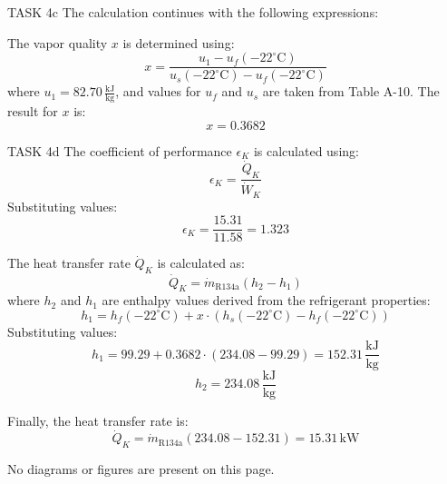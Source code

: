 TASK 4c  
The calculation continues with the following expressions:  

The vapor quality \( x \) is determined using:  
\[
x = \frac{u_1 - u_f(-22^\circ \text{C})}{u_s(-22^\circ \text{C}) - u_f(-22^\circ \text{C})}
\]  
where \( u_1 = 82.70 \, \frac{\text{kJ}}{\text{kg}} \), and values for \( u_f \) and \( u_s \) are taken from Table A-10. The result for \( x \) is:  
\[
x = 0.3682
\]  

TASK 4d  
The coefficient of performance \( \epsilon_K \) is calculated using:  
\[
\epsilon_K = \frac{\dot{Q}_K}{\dot{W}_K}
\]  
Substituting values:  
\[
\epsilon_K = \frac{15.31}{11.58} = 1.323
\]  

The heat transfer rate \( \dot{Q}_K \) is calculated as:  
\[
\dot{Q}_K = \dot{m}_{\text{R134a}} (h_2 - h_1)
\]  
where \( h_2 \) and \( h_1 \) are enthalpy values derived from the refrigerant properties:  
\[
h_1 = h_f(-22^\circ \text{C}) + x \cdot (h_s(-22^\circ \text{C}) - h_f(-22^\circ \text{C}))
\]  
Substituting values:  
\[
h_1 = 99.29 + 0.3682 \cdot (234.08 - 99.29) = 152.31 \, \frac{\text{kJ}}{\text{kg}}
\]  
\[
h_2 = 234.08 \, \frac{\text{kJ}}{\text{kg}}
\]  

Finally, the heat transfer rate is:  
\[
\dot{Q}_K = \dot{m}_{\text{R134a}} (234.08 - 152.31) = 15.31 \, \text{kW}
\]  

No diagrams or figures are present on this page.
